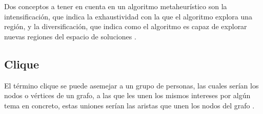 
Dos conceptos a tener en cuenta en un algoritmo metaheurístico son la intensificación, que indica la exhaustividad con la que el algoritmo explora una región, y la diversificación, que indica como el algoritmo es capaz de explorar nuevas regiones del espacio de soluciones \cite{libro-metaheuristicas}.

\subsection{Clique}
\label{sec-clique}
El término clique se puede asemejar a un grupo de personas, las cuales serían los nodos o vértices de un grafo, a las que les unen los mismos intereses por algún tema en concreto, estas uniones serían las aristas que unen los nodos del grafo \cite{LUCE:1949}.

